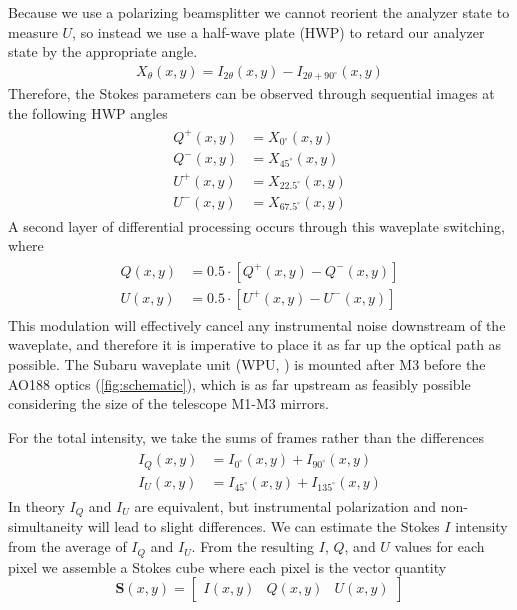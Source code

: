 Because we use a polarizing beamsplitter we cannot reorient the analyzer state to measure $U$, so instead we use a half-wave plate (HWP) to retard our analyzer state by the appropriate angle.
\begin{align}
    X_\theta(x, y) = I_{2\theta}(x, y) - I_{2\theta + 90^\circ}(x, y)
\end{align}
Therefore, the Stokes parameters can be observed through sequential images at the following HWP angles
\begin{align}
\begin{split}
    Q^+(x, y) &= X_{0^\circ}(x, y) \\
    Q^-(x, y) &= X_{45^\circ}(x, y) \\
    U^+(x, y) &= X_{22.5^\circ}(x, y) \\
    U^-(x, y) &= X_{67.5^\circ}(x, y)
\end{split}
\end{align}
A second layer of differential processing occurs through this waveplate switching, where
\begin{align}
\begin{split}
    \label{eqn:doublediff}
    Q(x, y) &= 0.5\cdot\left[Q^+(x, y) - Q^-(x, y)\right] \\
    U(x, y) &= 0.5\cdot\left[U^+(x, y) - U^-(x, y)\right]
\end{split}
\end{align}
This modulation will effectively cancel any instrumental noise downstream of the waveplate, and therefore it is imperative to place it as far up the optical path as possible. The Subaru waveplate unit (WPU, \citet{watanabe_near-infrared_2018}) is mounted after M3 before the AO188 optics (\autoref{fig:schematic}), which is as far upstream as feasibly possible considering the size of the telescope M1-M3 mirrors.

For the total intensity, we take the sums of frames rather than the differences
\begin{align}
\begin{split}
    I_Q(x, y) &= I_{0^\circ}(x, y) + I_{90^\circ}(x,y) \\
    I_U(x, y) &= I_{45^\circ}(x, y) + I_{135^\circ}(x,y)
\end{split}
\end{align}
In theory $I_Q$ and $I_U$ are equivalent, but instrumental polarization and non-simultaneity will lead to slight differences. We can estimate the Stokes $I$ intensity from the average of $I_Q$ and $I_U$. From the resulting $I$, $Q$, and $U$ values for each pixel we assemble a Stokes cube where each pixel is the vector quantity
\begin{equation}
    \mathbf{S}(x, y)= \left[\begin{matrix}
        I(x, y) & Q(x, y) & U(x, y)
    \end{matrix}\right]
\end{equation}

